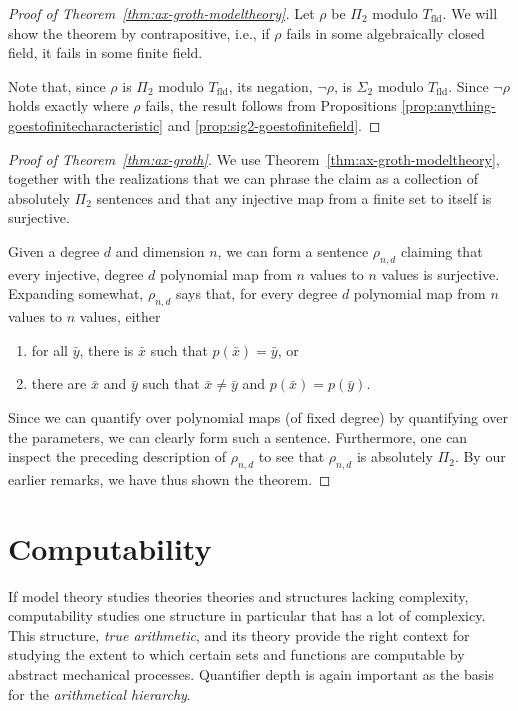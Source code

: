 \documentclass{article}
\theoremstyle{plain}
\theoremstyle{definition}
\newcommand{\defterm}{\emph}
\newcommand{\fieldthy}{T_{\operatorname{fld}}}
\newcommand{\tuple}{\bar}
\begin{document}
\begin{proof}[Proof of Theorem~\ref{thm:ax-groth-modeltheory}]
  Let $\rho$ be $\Pi_2$ modulo $\fieldthy$. We will show the theorem
  by contrapositive, i.e., if $\rho$ fails in some algebraically
  closed field, it fails in some finite field.

  Note that, since $\rho$ is $\Pi_2$ modulo $\fieldthy$, its negation,
  $\neg \rho$, is $\Sigma_2$ modulo $\fieldthy$. Since $\neg \rho$
  holds exactly where $\rho$ fails, the result follows from
  Propositions \ref{prop:anything-goestofinitecharacteristic} and
  \ref{prop:sig2-goestofinitefield}.
\end{proof}

\begin{proof}[Proof of Theorem~\ref{thm:ax-groth}]
  We use Theorem~\ref{thm:ax-groth-modeltheory}, together with the
  realizations that we can phrase the claim as a collection of
  absolutely $\Pi_2$ sentences and that any injective map from a
  finite set to itself is surjective.

  Given a degree $d$ and dimension $n$, we can form a sentence
  $\rho_{n,d}$ claiming that every injective, degree $d$ polynomial
  map from $n$ values to $n$ values is surjective. Expanding somewhat,
  $\rho_{n,d}$ says that, for every degree $d$ polynomial map from $n$
  values to $n$ values, either
  \begin{enumerate}
  \item for all $\tuple{y}$, there is $\tuple{x}$ such that $p(\tuple{x}) = \tuple{y}$, or
  \item there are $\tuple{x}$ and $\tuple{y}$ such that $\tuple{x}
    \neq \tuple{y}$ and $p(\tuple{x}) = p(\tuple{y})$.
  \end{enumerate}
  Since we can quantify over polynomial maps (of fixed degree) by
  quantifying over the parameters, we can clearly form such a
  sentence. Furthermore, one can inspect the preceding description of
  $\rho_{n,d}$ to see that $\rho_{n,d}$ is absolutely $\Pi_2$. By our
  earlier remarks, we have thus shown the theorem.
\end{proof}

\section{Computability}

If model theory studies theories theories and structures lacking
complexity, computability studies one structure in particular that has
a lot of complexicy. This structure, \defterm{true arithmetic}, and
its theory provide the right context for studying the extent to which
certain sets and functions are computable by abstract mechanical
processes. Quantifier depth is again important as the basis for the
\defterm{arithmetical hierarchy}.
\end{document}
